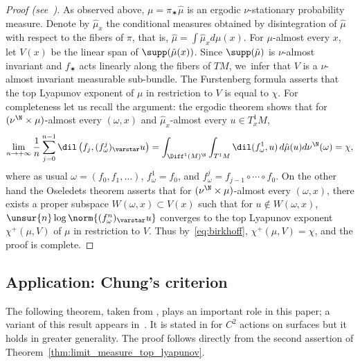 \begin{proof}[Proof (see~\cite{chung, hurtado:burnside})]
As observed above, $\mu = \pi_\varstar \hat \mu$ is an
ergodic $\nu$-stationary probability measure. Denote by $\hat\mu_x$ the conditional measures obtained
by disintegration of $\hat\mu$ with respect to the fibers of $\pi$, that is,
$\hat\mu = \int \hat\mu_x d\mu(x)$. For $\mu$-almost every $x$, let $V(x)$ be the linear span of
$\supp(\hat \mu(x))$. Since $\supp(\hat\mu)$ is $\nu$-almost invariant and
$f_\varstar $ acts linearly along the fibers of $TM$, we~infer that $V$ is a $\nu$-almost invariant
measurable sub-bundle. The Furstenberg formula asserts that
the top Lyapunov exponent of $\mu$ in restriction
to $V$ is equal to $\chi$. For completeness let us recall the argument:
the ergodic theorem shows that for $(\nu^\N\times \mu)$-almost every $(\omega, x)$
and $\hat\mu_x$-almost every $u\in T^1_xM$,\vspace*{-3pt}
\begin{equation}\label{eq:birkhoff}
\lim_{n\to + \infty} \frac{1}{n} \sum_{j=0}^{n-1} \dil\left( f_j, (f^j_\omega)_\varstar u \right) = \int_{\Diff^1(M)^\N} \int_{T^1M} \dil(f^1_\omega, u) \, d\hat\mu( u) d\nu^{\N}(\omega) = \chi,
\end{equation}
where as usual
$\omega=(f_0, f_1, \ldots)$, $f^1_\omega=f_0$, and $f^j_\omega= f_{j-1}\circ \cdots \circ f_0$.
On the other hand the Oseledets theorem asserts that for
$(\nu^\N\times \mu)$-almost every $(\omega, x)$, there exists a proper subspace
$W(\omega, x)\subset V(x)$ such that for $u\notin W(\omega, x)$,
$\unsur{n} \log\norm{(f^n_\omega)_\varstar u}$ converges to the top Lyapunov exponent $\chi^+(\mu, V)$
of $\mu$ in restriction to $V$. Thus by~\eqref{eq:birkhoff}, $\chi^+(\mu, V)=\chi$, and the proof is complete.
\end{proof}

\subsection{Application: Chung's criterion}

The following theorem, taken from \cite[Prop.\,3.17]{chung},
plays an important role in this paper; a variant of this result appears in~\cite{brown-fisher-hurtado}.
It is stated in \cite{chung} for $C^2$ actions on surfaces but
it holds in greater generality. The proof follows directly from the second assertion of Theorem~\ref{thm:limit_measure_top_lyapunov}.\enlargethispage{\baselineskip}%

